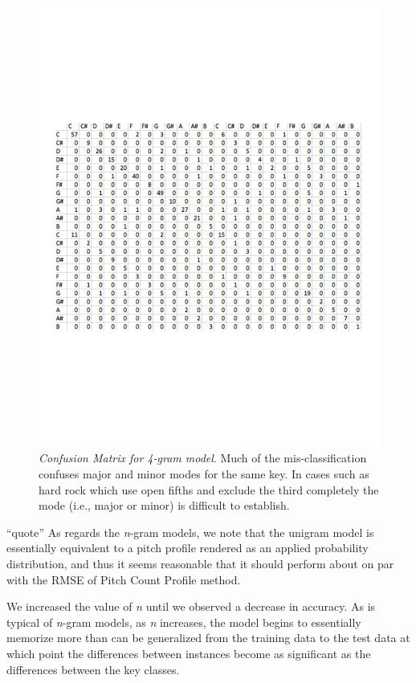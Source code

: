 \documentclass[letterpaper]{article}
\begin{document}
\begin{figure}
  \centering
 \includegraphics[width=\textwidth]{./confusion_matrix.pdf}
  \caption{\emph{Confusion Matrix for 4-gram model}. Much of the mis-classification confuses major and minor modes for the same key. In cases such as hard rock which use open fifths and exclude the third completely the mode (i.e., major or minor) is difficult to establish.}
  \label{fig:confusion_matrix}
\end{figure}
``quote''
As regards the \emph{n}-gram models, we note that the unigram model is essentially equivalent to a pitch profile rendered as an applied probability distribution, and thus it seems reasonable that it should perform about on par with the RMSE of Pitch Count Profile method.

We increased the value of \emph{n} until we observed a decrease in accuracy. As is typical of \emph{n}-gram models, as \emph{n} increases, the model begins to essentially memorize more than can be generalized from the training data to the test data at which point the differences between instances become as significant as the differences between the key classes.
\end{document}
